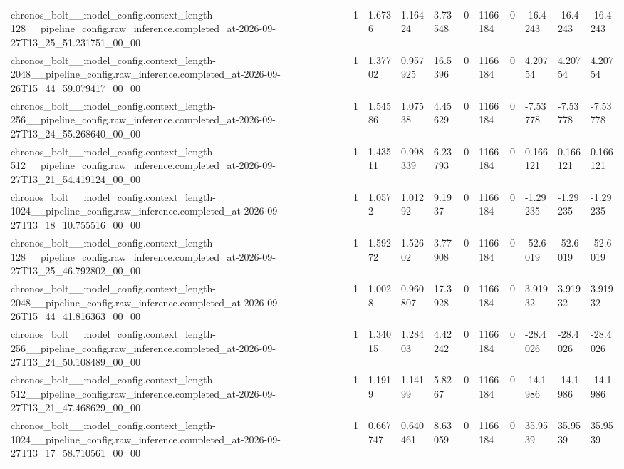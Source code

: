 \begin{tabular}{lllllllllll}
chronos\_bolt\_\_model\_config.context\_length-128\_\_pipeline\_config.raw\_inference.completed\_at-2026-09-27T13\_25\_51.231751\_00\_00 & 1 & 1.6736 & 1.16424 & 3.73548 & 0 & 1166184 & 0 & -16.4243 & -16.4243 & -16.4243 \\
chronos\_bolt\_\_model\_config.context\_length-2048\_\_pipeline\_config.raw\_inference.completed\_at-2026-09-26T15\_44\_59.079417\_00\_00 & 1 & 1.37702 & 0.957925 & 16.5396 & 0 & 1166184 & 0 & 4.20754 & 4.20754 & 4.20754 \\
chronos\_bolt\_\_model\_config.context\_length-256\_\_pipeline\_config.raw\_inference.completed\_at-2026-09-27T13\_24\_55.268640\_00\_00 & 1 & 1.54586 & 1.07538 & 4.45629 & 0 & 1166184 & 0 & -7.53778 & -7.53778 & -7.53778 \\
chronos\_bolt\_\_model\_config.context\_length-512\_\_pipeline\_config.raw\_inference.completed\_at-2026-09-27T13\_21\_54.419124\_00\_00 & 1 & 1.43511 & 0.998339 & 6.23793 & 0 & 1166184 & 0 & 0.166121 & 0.166121 & 0.166121 \\
chronos\_bolt\_\_model\_config.context\_length-1024\_\_pipeline\_config.raw\_inference.completed\_at-2026-09-27T13\_18\_10.755516\_00\_00 & 1 & 1.0572 & 1.01292 & 9.1937 & 0 & 1166184 & 0 & -1.29235 & -1.29235 & -1.29235 \\
chronos\_bolt\_\_model\_config.context\_length-128\_\_pipeline\_config.raw\_inference.completed\_at-2026-09-27T13\_25\_46.792802\_00\_00 & 1 & 1.59272 & 1.52602 & 3.77908 & 0 & 1166184 & 0 & -52.6019 & -52.6019 & -52.6019 \\
chronos\_bolt\_\_model\_config.context\_length-2048\_\_pipeline\_config.raw\_inference.completed\_at-2026-09-26T15\_44\_41.816363\_00\_00 & 1 & 1.0028 & 0.960807 & 17.3928 & 0 & 1166184 & 0 & 3.91932 & 3.91932 & 3.91932 \\
chronos\_bolt\_\_model\_config.context\_length-256\_\_pipeline\_config.raw\_inference.completed\_at-2026-09-27T13\_24\_50.108489\_00\_00 & 1 & 1.34015 & 1.28403 & 4.42242 & 0 & 1166184 & 0 & -28.4026 & -28.4026 & -28.4026 \\
chronos\_bolt\_\_model\_config.context\_length-512\_\_pipeline\_config.raw\_inference.completed\_at-2026-09-27T13\_21\_47.468629\_00\_00 & 1 & 1.1919 & 1.14199 & 5.8267 & 0 & 1166184 & 0 & -14.1986 & -14.1986 & -14.1986 \\
chronos\_bolt\_\_model\_config.context\_length-1024\_\_pipeline\_config.raw\_inference.completed\_at-2026-09-27T13\_17\_58.710561\_00\_00 & 1 & 0.667747 & 0.640461 & 8.63059 & 0 & 1166184 & 0 & 35.9539 & 35.9539 & 35.9539 \\

\end{tabular}

